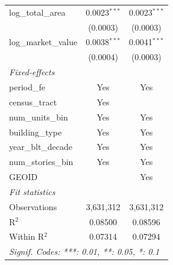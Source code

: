 \begin{tabular}{lcc}
   log\_total\_area                & 0.0023$^{***}$          & 0.0023$^{***}$\\   
                                   & (0.0003)                & (0.0003)\\   
   log\_market\_value              & 0.0038$^{***}$          & 0.0041$^{***}$\\   
                                   & (0.0004)                & (0.0003)\\   
   \midrule
   \emph{Fixed-effects}\\
   period\_fe                      & Yes                     & Yes\\  
   census\_tract                   & Yes                     & \\  
   num\_units\_bin                 & Yes                     & Yes\\  
   building\_type                  & Yes                     & Yes\\  
   year\_blt\_decade               & Yes                     & Yes\\  
   num\_stories\_bin               & Yes                     & Yes\\  
   GEOID                           &                         & Yes\\  
   \midrule
   \emph{Fit statistics}\\
   Observations                    & 3,631,312               & 3,631,312\\  
   R$^2$                           & 0.08500                 & 0.08596\\  
   Within R$^2$                    & 0.07314                 & 0.07294\\  
   \midrule \midrule
   \multicolumn{3}{l}{\emph{Signif. Codes: ***: 0.01, **: 0.05, *: 0.1}}\\
\end{tabular}
\par\endgroup
\begingroup
\centering
